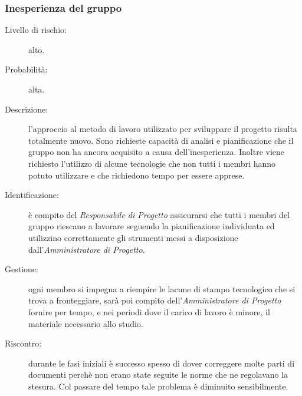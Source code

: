 \subsubsection{Inesperienza del gruppo}
\begin{description}
	\item[Livello di rischio:] alto.
	\item[Probabilità:] alta.
	\item[Descrizione:] l'approccio al metodo di lavoro utilizzato per sviluppare il progetto risulta totalmente nuovo. Sono richieste capacità di analisi	e pianificazione che il gruppo non ha ancora acquisito a causa dell'inesperienza. Inoltre viene richiesto l'utilizzo di alcune tecnologie che non tutti i membri hanno potuto utilizzare e che richiedono tempo per essere apprese.
	\item[Identificazione:] è compito del \textit{Responsabile di Progetto} assicurarsi che tutti i membri del gruppo riescano a lavorare seguendo la pianificazione individuata ed utilizzino correttamente gli strumenti messi a disposizione dall'\textit{Amministratore di Progetto}.
	\item[Gestione:] ogni membro si impegna a riempire le lacune di stampo tecnologico che si trova a fronteggiare, sarà poi compito dell'\textit{Amministratore di Progetto} fornire per tempo, e nei periodi dove il carico di lavoro è minore, il materiale necessario allo studio.
	\item[Riscontro:] durante le fasi iniziali è successo spesso di dover correggere molte parti di documenti perchè non erano state seguite le norme che ne regolavano la stesura. Col passare del tempo tale problema è diminuito sensibilmente. 
\end{description}

